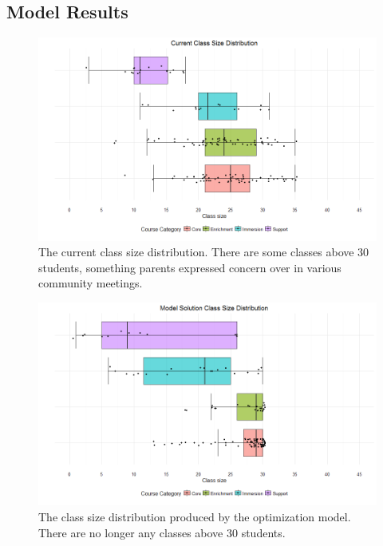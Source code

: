 \documentclass[12pt]{article}
\begin{document}
\subsection{Model Results}

\begin{figure}
\centering
	\includegraphics[width=\linewidth]{./current_class_size_distribution}
	\caption{The current class size distribution. There are some classes above 30 students, something parents expressed concern over in various community meetings.}
	\label{fig:current-class-size-distribution}
\end{figure}

\begin{figure}
\centering
	\includegraphics[width=\linewidth]{./model_solution_class_size_distribution}
	\caption{The class size distribution produced by the optimization model. There are no longer any classes above 30 students.}
	\label{fig:model-class-size-distribution}
\end{figure}
\end{document}
